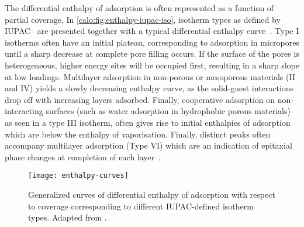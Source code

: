 The differential enthalpy of adsorption is often represented as a
function of partial coverage. In \autoref{calo:fig:enthalpy-iupac-iso},
isotherm types as defined by IUPAC~\cite{thommesPhysisorptionGasesSpecial2015}
are presented together with a typical differential enthalpy
curve~\cite{llewellynGasAdsorptionMicrocalorimetry2005}. Type I isotherms often
have an initial plateau, corresponding to adsorption in micropores
until a sharp decrease at complete pore filling occurs. If the surface
of the pores is heterogeneous, higher energy sites will be occupied
first, resulting in a sharp slope at low loadings. Multilayer
adsorption in non-porous or mesoporous materials (II and IV) yields
a slowly decreasing enthalpy curve, as the solid-guest interactions
drop off with increasing layers adsorbed. Finally, cooperative adsorption
on non-interacting surfaces (such as water adsorption in hydrophobic porous
materials) as seen in a type III isotherm, often gives rise to initial enthalpies
of adsorption which are below the enthalpy of vaporisation.
Finally, distinct peaks often accompany multilayer adsorption (Type VI)
which are an indication of epitaxial phase
changes at completion of each layer~\cite{llewellynAdsorptionMFItypeZeolites1993, %
	llewellynAdsorptionMFItypeZeolites1993a, %
	rouquerolCalorimetricEvidenceBidimensional1977}.

\begin{figure}[htb]
	\centering

	\texttt{[image: enthalpy-curves]}
	\caption{
		Generalized curves of differential enthalpy of adsorption with
		respect to coverage corresponding to different
		IUPAC-defined isotherm types.
		Adapted from \citeauthor{llewellynGasAdsorptionMicrocalorimetry2005}%
		\cite{llewellynGasAdsorptionMicrocalorimetry2005}.
	}%
	\label{calo:fig:enthalpy-iupac-iso}

\end{figure}
